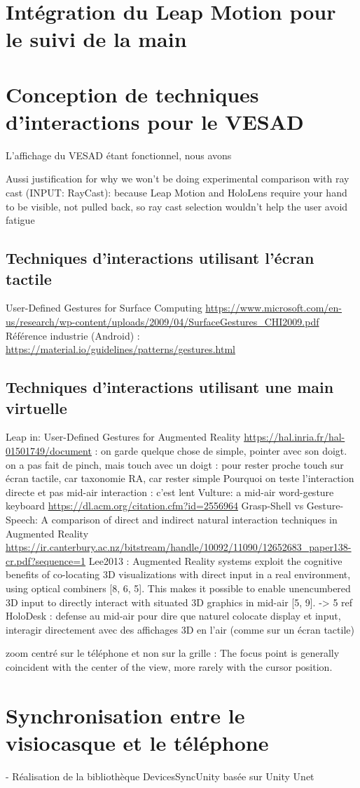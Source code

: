 \section{Intégration du Leap Motion pour le suivi de la main}
\label{sec:hand_tracking}


\section{Conception de techniques d'interactions pour le VESAD}
\label{sec:interaction_techniques}
L'affichage du VESAD étant fonctionnel, nous avons 

Aussi justification for why we won’t be doing experimental comparison with ray cast (INPUT: RayCast): because Leap Motion and HoloLens require your hand to be visible, not pulled back, so ray cast selection wouldn’t help the user avoid fatigue

\subsection{Techniques d'interactions utilisant l'écran tactile}
User-Defined Gestures for Surface Computing \url{https://www.microsoft.com/en-us/research/wp-content/uploads/2009/04/SurfaceGestures_CHI2009.pdf}
Référence industrie (Android) : \url{https://material.io/guidelines/patterns/gestures.html}

\subsection{Techniques d'interactions utilisant une main virtuelle}
Leap in:
User-Defined Gestures for Augmented Reality \url{https://hal.inria.fr/hal-01501749/document} : on garde quelque chose de simple, pointer avec son doigt. on a pas fait de pinch, mais touch avec un doigt : pour rester proche touch sur écran tactile, car taxonomie RA, car rester simple
Pourquoi on teste l'interaction directe et pas mid-air interaction : c'est lent Vulture: a mid-air word-gesture keyboard \url{https://dl.acm.org/citation.cfm?id=2556964}
Grasp-Shell vs Gesture-Speech: A comparison of direct and indirect natural interaction
techniques in Augmented Reality \url{https://ir.canterbury.ac.nz/bitstream/handle/10092/11090/12652683_paper138-cr.pdf?sequence=1}
Lee2013 : Augmented Reality systems exploit the cognitive benefits of co-locating 3D visualizations with direct input in a real environment, using optical combiners [8, 6, 5]. This makes it possible to enable unencumbered 3D input to directly interact with situated 3D graphics in mid-air [5, 9]. -> 5 ref HoloDesk : defense au mid-air pour dire que naturel colocate display et input, interagir directement avec des affichages 3D en l'air (comme sur un écran tactile)

zoom centré sur le téléphone et non sur la grille : The focus point is generally coincident with the center of the view, more rarely with the cursor position. \cite{Guiard2004}


\section{Synchronisation entre le visiocasque et le téléphone}
\label{sec:synchronization}
- Réalisation de la bibliothèque DevicesSyncUnity basée sur Unity Unet